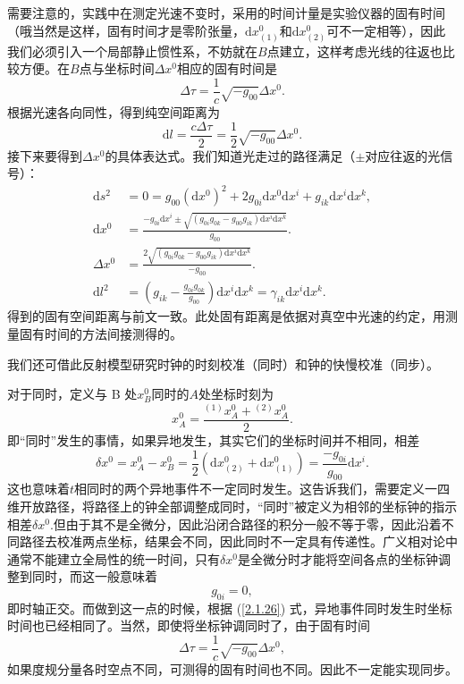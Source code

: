 \documentclass[11pt, a4paper, oneside, onecolumn]{ctexart}
\numberwithin{equation}{subsection}
\begin{document}
需要注意的，实践中在测定光速不变时，采用的时间计量是实验仪器的固有时间（哦当然是这样，固有时间才是零阶张量，$\mathrm{d}x^{0}_{\left(1\right)}$和$\mathrm{d}x^{0}_{\left(2\right)}$可不一定相等），因此我们必须引入一个局部静止惯性系，不妨就在$B$点建立，这样考虑光线的往返也比较方便。在$B$点与坐标时间$\Delta{}x^{0}$相应的固有时间是
\begin{equation}
\Delta{}\tau=\frac{1}{c}\sqrt{-g_{00}}\Delta{}x^{0}.
\end{equation}
根据光速各向同性，得到纯空间距离为
\begin{equation}
\mathrm{d}l=\frac{c\Delta{}\tau}{2}=\frac12\sqrt{-g_{00}}\Delta{}x^{0}.
\end{equation}
接下来要得到$\Delta{}x^{0}$的具体表达式。我们知道光走过的路径满足（$\pm$对应往返的光信号）：
\begin{align}
\mathrm{d}s^{2}&=0=g_{00}\left(\mathrm{d}x^{0}\right)^{2}+2g_{0i}\mathrm{d}x^{0}\mathrm{d}x^{i}+g_{ik}\mathrm{d}x^{i}\mathrm{d}x^{k},\\
\mathrm{d}x^{0}&=\frac{-g_{0i}\mathrm{d}x^{i}\pm\sqrt{\left(g_{0i}g_{0k}-g_{00}g_{ik}\right)\mathrm{d}x^{i}\mathrm{d}x^{k}}}{g_{00}}.\label{往返}\\
\Delta{}x^{0}&=\frac{2\sqrt{\left(g_{0i}g_{0k}-g_{00}g_{ik}\right)\mathrm{d}x^{i}\mathrm{d}x^{k}}}{-g_{00}}.\\
\mathrm{d}l^{2}&=\left(g_{ik}-\frac{g_{0i}g_{0k}}{g_{00}}\right)\mathrm{d}x^{i}\mathrm{d}x^{k}=\gamma_{ik}\mathrm{d}x^{i}\mathrm{d}x^{k}.
\end{align}
得到的固有空间距离与前文一致。此处固有距离是依据对真空中光速的约定，用测量固有时间的方法间接测得的。

我们还可借此反射模型研究时钟的时刻校准（同时）和钟的快慢校准（同步）。

对于同时，定义与 B 处$x_{B}^{0}$同时的$A$处坐标时刻为
\begin{equation}
x_{A}^{0}=\frac{{}^{\left(1\right)}x_{A}^{0}+{}^{\left(2\right)}x_{A}^{0}}{2}.
\end{equation}
即“同时”发生的事情，如果异地发生，其实它们的坐标时间并不相同，相差
\begin{equation}
\delta{}x^{0}=x_{A}^{0}-x_{B}^{0}=\frac12\left(\mathrm{d}x^{0}_{\left(2\right)}+\mathrm{d}x^{0}_{\left(1\right)}\right)=\frac{-g_{0i}}{g_{00}}\mathrm{d}x^{i}.\label{2.1.26}
\end{equation}
这也意味着$t$相同时的两个异地事件不一定同时发生。这告诉我们，需要定义一四维开放路径，将路径上的钟全部调整成同时，“同时”被定义为相邻的坐标钟的指示相差$\delta{}x^{0}$.但由于其不是全微分，因此沿闭合路径的积分一般不等于零，因此沿着不同路径去校准两点坐标，结果会不同，因此同时不一定具有传递性。广义相对论中通常不能建立全局性的统一时间，只有$\delta{}x^{0}$是全微分时才能将空间各点的坐标钟调整到同时，而这一般意味着
\begin{equation}
g_{0i}=0,
\end{equation}
即时轴正交。而做到这一点的时候，根据 (\ref{2.1.26}) 式，异地事件同时发生时坐标时间也已经相同了。当然，即使将坐标钟调同时了，由于固有时间
\begin{equation}
\Delta{}\tau=\frac{1}{c}\sqrt{-g_{00}}\Delta{}x^{0},
\end{equation}
如果度规分量各时空点不同，可测得的固有时间也不同。因此不一定能实现同步。
\end{document}
